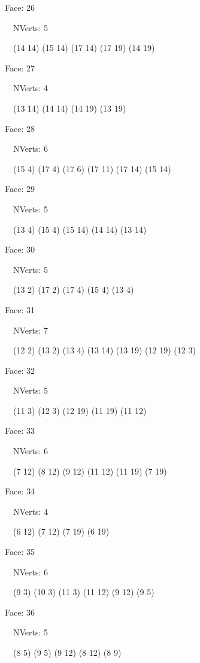 \documentclass{article}
\begin{document}
{\footnotesize 

Face: 26

\   \    NVerts: 5

 \   \   (14 14) (15 14) (17 14) (17 19) (14 19)}

{\footnotesize 

Face: 27

\   \    NVerts: 4

 \   \   (13 14) (14 14) (14 19) (13 19)}

{\footnotesize 

Face: 28

\   \    NVerts: 6

 \   \   (15 4) (17 4) (17 6) (17 11) (17 14) (15 14)}

{\footnotesize 

Face: 29

\   \    NVerts: 5

 \   \   (13 4) (15 4) (15 14) (14 14) (13 14)}

{\footnotesize 

Face: 30

\   \    NVerts: 5

 \   \   (13 2) (17 2) (17 4) (15 4) (13 4)}

{\footnotesize 

Face: 31

\   \    NVerts: 7

 \   \   (12 2) (13 2) (13 4) (13 14) (13 19) (12 19) (12 3)}

{\footnotesize 

Face: 32

\   \    NVerts: 5

 \   \   (11 3) (12 3) (12 19) (11 19) (11 12)}

{\footnotesize 

Face: 33

\   \    NVerts: 6

 \   \   (7 12) (8 12) (9 12) (11 12) (11 19) (7 19)}

{\footnotesize 

Face: 34

\   \    NVerts: 4

 \   \   (6 12) (7 12) (7 19) (6 19)}

{\footnotesize 

Face: 35

\   \    NVerts: 6

 \   \   (9 3) (10 3) (11 3) (11 12) (9 12) (9 5)}

{\footnotesize 

Face: 36

\   \    NVerts: 5

 \   \   (8 5) (9 5) (9 12) (8 12) (8 9)}
\end{document}
